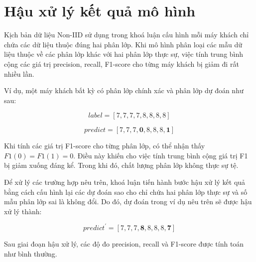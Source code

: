 \chapter{Hậu xử lý kết quả mô hình}
\label{Appendix2}

Kịch bản dữ liệu Non-IID sử dụng trong khoá luận cấu hình mỗi máy khách chỉ chứa các dữ liệu thuộc đúng hai phân lớp. Khi mô hình phân loại các mẫu dữ liệu thuộc về các phân lớp khác với hai phân lớp thực sự, việc tính trung bình cộng các giá trị precision, recall, F1-score cho từng máy khách bị giảm đi rất nhiều lần.

Ví dụ, một máy khách bất kỳ có phân lớp chính xác và phân lớp dự đoán như sau:

\begin{equation*}
    label = [7, 7, 7, 7, 8, 8, 8, 8]
\end{equation*}

\begin{equation*}
    predict = [7, 7, 7, \mathbf{0}, 8, 8, 8, \mathbf{1}]
\end{equation*}

Khi tính các giá trị F1-score cho từng phân lớp, có thể nhận thấy $F1(0) = F1(1) = 0$. Điều này khiến cho việc tính trung bình cộng giá trị F1 bị giảm xuống đáng kể. Trong khi đó, chất lượng phân lớp không thực sự tệ.

Để xử lý các trường hợp nêu trên, khoá luận tiến hành bước hậu xử lý kết quả bằng cách cấu hình lại các dự đoán sao cho chỉ chứa hai phân lớp thực sự và số mẫu phân lớp sai là không đổi. Do đó, dự đoán trong ví dụ nêu trên sẽ được hậu xử lý thành:

\begin{equation*}
    predict^' = [7, 7, 7, \mathbf{8}, 8, 8, 8, \mathbf{7}]
\end{equation*}

Sau giai đoạn hậu xử lý, các độ đo precision, recall và F1-score được tính toán như bình thường.
